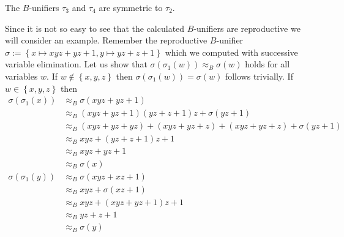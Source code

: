 	The $B$-unifiers $\tau_3$ and $\tau_4$ are symmetric to $\tau_2$.
			
	Since it is not so easy to see that the calculated $B$-unifiers are reproductive we will consider an example.
	Remember the reproductive $B$-unifier $\sigma:=\left\lbrace x\mapsto xyz+yz+1,y\mapsto yz+z+1\right\rbrace$ which we computed with successive variable elimination. Let us show that $\sigma(\sigma_1(w))\approx_B\sigma(w)$ holds for all variables $w$. If $w\notin\left\lbrace x,y,z\right\rbrace $ then $\sigma(\sigma_1(w))=\sigma(w)$ follows trivially. If $w\in\left\lbrace x,y,z\right\rbrace $ then
	\begin{align*}
		\sigma(\sigma_1(x)) & \approx_B\sigma(xyz+yz+1)                               \\
		                    & \approx_B(xyz+yz+1)(yz+z+1)z+\sigma(yz+1)               \\
		                    & \approx_B(xyz+yz+yz)+(xyz+yz+z)+(xyz+yz+z)+\sigma(yz+1) \\
		                    & \approx_Bxyz+(yz+z+1)z+1                                \\
		                    & \approx_Bxyz+yz+1                                       \\
		                    & \approx_B\sigma(x)                                      \\
		\sigma(\sigma_1(y)) & \approx_B\sigma(xyz+xz+1)                               \\
		                    & \approx_Bxyz+\sigma(xz+1)                               \\
		                    & \approx_Bxyz+(xyz+yz+1)z+1                              \\
		                    & \approx_Byz+z+1                                         \\
		                    & \approx_B\sigma(y)                                      
	\end{align*}
